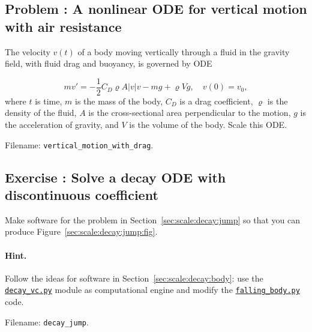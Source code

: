 \documentclass[graybox,envcountchap,sectrefs,final]{svmonodo}
\newenvironment{doconceexercise}{}{}
\newcounter{doconceexercisecounter}
\begin{document}
\begin{doconceexercise}

\subsection*{Problem \thedoconceexercisecounter: A nonlinear ODE for vertical motion with air resistance}

\label{sec:scale:exer:ball_y_wdrag}

The velocity $v(t)$
of a body moving vertically through a fluid in the gravity field,
with fluid drag and buoyancy, is governed by ODE

\[ mv' = -\frac{1}{2}C_D\varrho A |v|v - mg + \varrho V g,\quad v(0)=v_0,\]
where $t$ is time, $m$ is the mass of the body, $C_D$ is a drag coefficient,
$\varrho$ is the density of the fluid, $A$ is the cross-sectional area
perpendicular to the motion, $g$ is the acceleration of gravity,
and $V$ is the volume of the body. Scale this ODE.


\noindent Filename: \Verb!vertical_motion_with_drag!.

\end{doconceexercise}




\begin{doconceexercise}

\subsection*{Exercise \thedoconceexercisecounter: Solve a decay ODE with discontinuous coefficient}

\label{sec:scale:exer:decay:jump}

Make software for the problem in Section~\ref{sec:scale:decay:jump}
so that you can produce Figure~\ref{sec:scale:decay:jump:fig}.


\paragraph{Hint.}
Follow the ideas for software in Section~\ref{sec:scale:decay:body}: use the
\href{{http://tinyurl.com/o8pb3yy/decay_vc.py}}{\nolinkurl{decay_vc.py}} module as computational
engine and modify the
\href{{http://tinyurl.com/o8pb3yy/falling_body.py}}{\nolinkurl{falling_body.py}} code.



\noindent Filename: \Verb!decay_jump!.

\end{doconceexercise}
\end{document}
